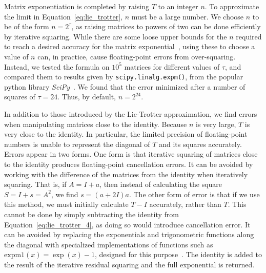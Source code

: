\documentclass{jors}
\begin{document}
		Matrix exponentiation is completed by raising $ T $ to an integer $ n $.
		To approximate the limit in Equation~\eqref{eq:lie_trotter}, $ n $ must be a large number.
		We choose $ n $ to be of the form $ n = 2^\tau $, as raising matrices to powers of two can be done efficiently by iterative squaring.
		While there are some loose upper bounds for the $ n $ required to reach a desired accuracy for the matrix exponential~\cite{suzuki_generalized_1976}, using these to choose a value of $ n $ can, in practice, cause floating-point errors from over-squaring.
		Instead, we tested the formula on $ 10^5 $ matrices for different values of $ \tau $, and compared them to results given by \texttt{scipy.linalg.expm()}, from the popular python library \emph{SciPy}~\cite{virtanen_scipy_2020}.
		We found that the error minimized after a number of squares of $ \tau = 24 $.
		Thus, by default, $ n = 2^{24} $.

		In addition to those introduced by the Lie-Trotter approximation, we find errors when manipulating matrices close to the identity.
		Because $ n $ is very large, $ T $ is very close to the identity.
		In particular, the limited precision of floating-point numbers is unable to represent the diagonal of $ T $ and its squares accurately.
		Errors appear in two forms.
		One form is that iterative squaring of matrices close to the identity produces floating-point cancellation errors.
		It can be avoided by working with the difference of the matrices from the identity when iteratively squaring.
		That is, if $ A = I + a $, then instead of calculating the square $ S = I + s = A^2 $, we find $ s = (a + 2I)a $.
		The other form of error is that if we use this method, we must initially calculate $ T - I $ accurately, rather than $ T $.
		This cannot be done by simply subtracting the identity from Equation~\eqref{eq:lie_trotter_4}, as doing so would introduce cancellation error.
		It can be avoided by replacing the exponentials and trigonometric functions along the diagonal with specialized implementations of functions such as $ \mathrm{expm}1(x) = \exp(x) - 1 $, designed for this purpose~\cite{hewlett-packard_hp_1994}.
		The identity is added to the result of the iterative residual squaring and the full exponential is returned.
		
\end{document}
